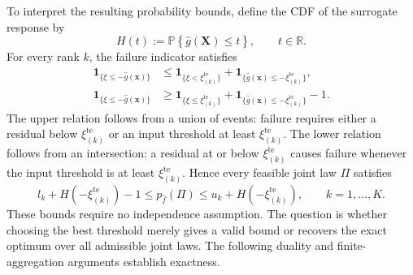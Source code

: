 \documentclass[review,11pt,3p,authoryear,nopreprintline]{elsarticle}
\begin{document}
To interpret the resulting probability bounds, define the CDF of the surrogate response by
\begin{equation}
  H(t):=\mathbb P\left\{\hat g(\bm X)\le t\right\},\qquad t\in\mathbb R.
  \label{eq-surrogate-response-cdf}
\end{equation}
For every rank $k$, the failure indicator satisfies
\begin{align}
  \mathbf1_{\{\xi\le -\hat g(\bm x)\}}
  &\le
  \mathbf1_{\{\xi<\xi_{(k)}^{\mathrm{te}}\}}+\mathbf1_{\{\hat g(\bm x)\le-\xi_{(k)}^{\mathrm{te}}\}},
  \label{eq-upper-threshold-certificate}\\
  \mathbf1_{\{\xi\le -\hat g(\bm x)\}}
  &\ge
  \mathbf1_{\{\xi\le \xi_{(k)}^{\mathrm{te}}\}}+\mathbf1_{\{\hat g(\bm x)\le-\xi_{(k)}^{\mathrm{te}}\}}-1.
  \label{eq-lower-threshold-certificate}
\end{align}
The upper relation follows from a union of events: failure requires either a residual below $\xi_{(k)}^{\mathrm{te}}$ or an input threshold at least $\xi_{(k)}^{\mathrm{te}}$. The lower relation follows from an intersection: a residual at or below $\xi_{(k)}^{\mathrm{te}}$ causes failure whenever the input threshold is at least $\xi_{(k)}^{\mathrm{te}}$. Hence every feasible joint law $\Pi$ satisfies
\begin{equation}
  l_k+H\left(-\xi_{(k)}^{\mathrm{te}}\right)-1\le p_{\hat f}(\Pi)\le u_k+H\left(-\xi_{(k)}^{\mathrm{te}}\right),
  \qquad k=1,\ldots,K.
  \label{eq-rankwise-failure-bounds}
\end{equation}
These bounds require no independence assumption. The question is whether choosing the best threshold merely gives a valid bound or recovers the exact optimum over all admissible joint laws. The following duality and finite-aggregation arguments establish exactness.
\end{document}

